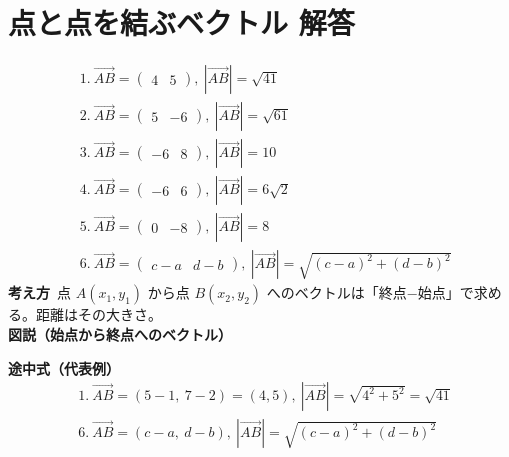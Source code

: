 \documentclass[paper=b4j,landscape,twocolumn,fleqn]{jlreq}
\begin{document}
\newpage
\section{点と点を結ぶベクトル 解答}
\begin{align*}
&1.\ \overrightarrow{AB}=\begin{pmatrix}4 & 5\end{pmatrix},\ |\overrightarrow{AB}|=\sqrt{41}\\[0.45em]
&2.\ \overrightarrow{AB}=\begin{pmatrix}5 & -6\end{pmatrix},\ |\overrightarrow{AB}|=\sqrt{61}\\[0.45em]
&3.\ \overrightarrow{AB}=\begin{pmatrix}-6 & 8\end{pmatrix},\ |\overrightarrow{AB}|=10\\[0.45em]
&4.\ \overrightarrow{AB}=\begin{pmatrix}-6 & 6\end{pmatrix},\ |\overrightarrow{AB}|=6\sqrt{2}\\[0.45em]
&5.\ \overrightarrow{AB}=\begin{pmatrix}0 & -8\end{pmatrix},\ |\overrightarrow{AB}|=8\\[0.45em]
&6.\ \overrightarrow{AB}=\begin{pmatrix}c-a & d-b\end{pmatrix},\ |\overrightarrow{AB}|=\sqrt{(c-a)^2+(d-b)^2}
\end{align*}
\textbf{考え方}\
点 $A(x_1,y_1)$ から点 $B(x_2,y_2)$ へのベクトルは「終点−始点」で求める。距離はその大きさ。\\
\textbf{図説（始点から終点へのベクトル）}
\begin{center}
\end{center}
\textbf{途中式（代表例）}
\begin{align*}
&1.\ \overrightarrow{AB}=(5-1,\ 7-2)=(4,5),\ |\overrightarrow{AB}|=\sqrt{4^2+5^2}=\sqrt{41}\\
&6.\ \overrightarrow{AB}=(c-a,\ d-b),\ |\overrightarrow{AB}|=\sqrt{(c-a)^2+(d-b)^2}
\end{align*}
\end{document}
